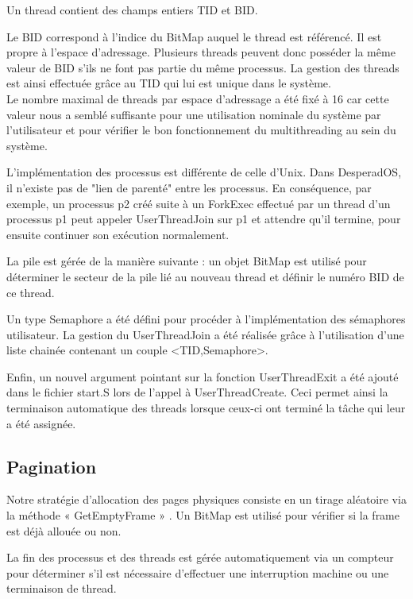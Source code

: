 \documentclass[12pt]{report}
\begin{document}
Un thread contient des champs entiers TID et BID.

Le BID correspond à l'indice du BitMap auquel le thread est référencé. Il est propre à l'espace d'adressage. Plusieurs threads peuvent donc posséder la même valeur de BID s'ils ne font pas partie du même processus. La gestion des threads est ainsi effectuée grâce au TID qui lui est unique dans le système. \\

Le nombre maximal de threads par espace d'adressage a été fixé à 16 car cette valeur nous a semblé suffisante pour une utilisation nominale du système par l'utilisateur et pour vérifier le bon fonctionnement du multithreading au sein du système.

\bigskip

L'implémentation des processus est différente de celle d'Unix. Dans DesperadOS, il n'existe pas de "lien de parenté" entre les processus. En conséquence, par exemple, un processus p2 créé suite à un ForkExec effectué par un thread d'un processus p1 peut appeler UserThreadJoin sur p1 et attendre qu'il termine, pour ensuite continuer son exécution normalement.
\bigskip

La pile est gérée de la manière suivante :
un objet BitMap est utilisé pour déterminer le secteur de la pile lié au nouveau thread et définir le numéro BID de ce thread.
\bigskip

Un type Semaphore a été défini pour procéder à l'implémentation des sémaphores utilisateur. 
La gestion du UserThreadJoin a été réalisée grâce à l'utilisation d'une liste chainée contenant un couple <TID,Semaphore>.
\bigskip

Enfin, un nouvel argument pointant sur la fonction UserThreadExit a été ajouté dans le fichier start.S lors de l'appel à UserThreadCreate. Ceci permet ainsi la terminaison automatique des threads lorsque ceux-ci ont terminé la tâche qui leur a été assignée.



\subsection{Pagination}


Notre stratégie d’allocation des pages physiques consiste en un tirage aléatoire via la méthode « GetEmptyFrame » . Un BitMap est utilisé pour vérifier si la frame est déjà allouée ou non.
\bigskip

La fin des processus et des threads est gérée automatiquement via un compteur pour déterminer s'il est nécessaire d'effectuer une interruption machine ou une terminaison de thread.
\bigskip
\end{document}
